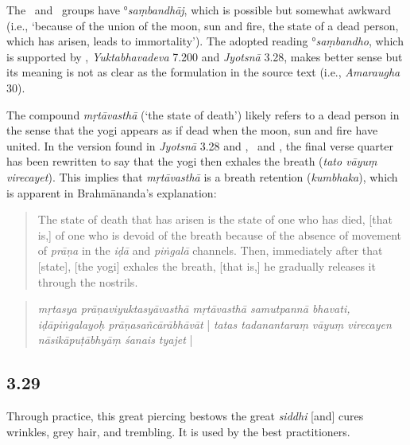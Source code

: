 \begin{ekdosis}
\begin{philcomm}[hp03_028]
The \textalpha\ and \textgamma\ groups have °\emph{saṃbandhāj}, which is possible but somewhat awkward (i.e., `because of the union of the moon, sun and fire, the state of a dead person, which has arisen, leads to immortality'). The adopted reading °\emph{saṃbandho}, which is supported by \zetaTwo, \emph{Yuktabhavadeva} 7.200 and \emph{Jyotsnā} 3.28, makes better sense but its meaning is not as clear as the formulation in the source text (i.e., \emph{Amaraugha} 30).\lb

The compound \emph{mṛtāvasthā} (`the state of death') likely refers to a dead person in the sense that the yogi appears as if dead when the moon, sun and fire have united. In the version found in \emph{Jyotsnā} 3.28 and \etaOne, \etaTwo\ and \zetaThree, the final verse quarter has been rewritten to say that the yogi then exhales the breath (\emph{tato vāyuṃ virecayet}). This implies that \emph{mṛtāvasthā} is a breath retention (\emph{kumbhaka}), which is apparent in Brahmānanda's explanation:
\begin{quote}
The state of death that has arisen is the state of one who has died, [that is,] of one who is devoid of the breath because of the absence of movement of \emph{prāṇa} in the \emph{iḍā} and \emph{piṅgalā} channels. Then, immediately after that [state], [the yogi] exhales the breath, [that is,] he gradually releases it through the nostrils.
\end{quote}
\begin{quote}
\emph{mṛtasya prāṇaviyuktasyāvasthā mṛtāvasthā samutpannā bhavati, iḍāpiṅgalayoḥ prāṇasañcārābhāvāt} | \emph{tatas tadanantaraṃ vāyuṃ virecayen nāsikāpuṭābhyāṃ śanais tyajet} |
\end{quote}

\end{philcomm}

\subsection*{3.29}
\begin{translation}[hp03_029]
Through practice, this great piercing bestows the great \emph{siddhi} [and] cures wrinkles, grey hair, and trembling. It is used by the best practitioners.
\end{translation}



\end{ekdosis}
